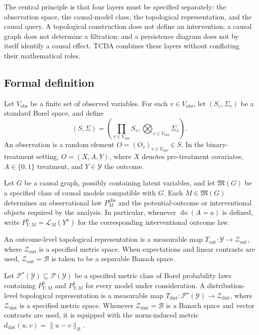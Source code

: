 \documentclass[11pt,a4paper]{article}
\theoremstyle{plain}
\theoremstyle{definition}
\theoremstyle{remark}
\newcommand{\1}{\mathbbm{1}}
\begin{document}
The central principle is that four layers must be specified
separately: the observation space, the causal-model class, the
topological representation, and the causal query. A topological construction does not define an intervention; a causal graph does not determine a filtration; and a persistence diagram does not by itself identify a causal effect. TCDA combines these layers without conflating their mathematical roles.

\subsection{Formal definition}
\label{subsec:formal-definition}

Let \(V_{\mathrm{obs}}\) be a finite set of observed variables. For each \(v\in V_{\mathrm{obs}}\), let \((S_v,\Sigma_v)\) be a standard Borel space, and define
\[
(S,\Sigma)
=
\left(
\prod_{v\in V_{\mathrm{obs}}}S_v,
\bigotimes_{v\in V_{\mathrm{obs}}}\Sigma_v
\right).
\]
An observation is a random element \(O=(O_v)_{v\in V_{\mathrm{obs}}}\in S\). In the binary-treatment
setting, \(O=(X,A,Y)\), where \(X\) denotes pre-treatment covariates, \(A\in\{0,1\}\) treatment, and \(Y\in\mathcal Y\) the outcome.

Let \(G\) be a causal graph, possibly containing latent variables, and let \(\mathfrak M(G)\) be a specified class of causal models compatible with \(G\). Each \(M\in\mathfrak M(G)\) determines an observational law \(P_M^{\mathrm{obs}}\) and the potential-outcome or interventional objects required by the analysis. In particular, whenever \(\operatorname{do}(A=a)\) is defined, write \(P_{Y,M}^a = \mathcal L_M(Y^a)\) for the corresponding interventional outcome law.

An outcome-level topological representation is a measurable map \(T_{\mathrm{out}}: \mathcal Y\longrightarrow\mathcal Z_{\mathrm{out}}\), where \(\mathcal Z_{\mathrm{out}}\) is a specified metric space. When expectations and linear contrasts are used, \(\mathcal Z_{\mathrm{out}}=\mathcal B\) is taken to be a separable Banach space.

Let \(\mathcal P^\star(\mathcal Y)\subseteq\mathcal P(\mathcal Y)\) be a specified metric class of Borel probability laws containing \(P_{Y,M}^0\) and \(P_{Y,M}^1\) for every model under consideration. A distribution-level topological representation is a measurable map
\(T_{\mathrm{dist}}: \mathcal P^\star(\mathcal Y)
\longrightarrow \mathcal Z_{\mathrm{dist}}\), where \(\mathcal Z_{\mathrm{dist}}\) is a specified metric space. Whenever \(\mathcal Z_{\mathrm{dist}}=\mathcal B\) is a Banach space and vector contrasts are used, it is equipped with the norm-induced metric \(d_{\mathrm{dist}}(u,v)=\|u-v\|_{\mathcal B}\).
\end{document}
